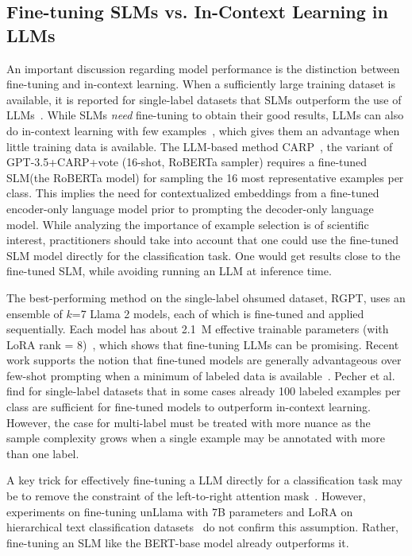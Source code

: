 \documentclass[lettersize,journal]{IEEEtran}
\newcommand{\SLM}{SLM\xspace}
\newcommand{\SLMs}{SLMs\xspace}
\newcommand{\LLM}{LLM\xspace}
\newcommand{\LLMs}{LLMs\xspace}
\begin{document}
\subsection{Fine-tuning \SLMs vs. In-Context Learning in \LLMs}

An important discussion regarding model performance is the distinction between fine-tuning and in-context learning. 
When a sufficiently large training dataset is available, it is reported for single-label datasets that \SLMs outperform the use of \LLMs~\cite{DBLP:conf/emnlp/PecherSB25-100-samples}.
While SLMs \emph{need} fine-tuning to obtain their good results, LLMs can also do in-context learning with few examples~\cite{DBLP:conf/emnlp/PecherSB25-100-samples}, which gives them an advantage when little training data is available.  
The \LLM-based method  CARP~\cite{carp}, \ie the variant of GPT-3.5+CARP+vote (16-shot, RoBERTa sampler) requires a fine-tuned \SLM (the RoBERTa model) for sampling the 16 most representative examples per class.
This implies the need for contextualized embeddings from a fine-tuned encoder-only language model prior to prompting the decoder-only language model. 
While analyzing the importance of example selection is of scientific interest, practitioners should take into account that one could use the fine-tuned SLM model directly for the classification task.
One would get results close to the fine-tuned SLM, while avoiding running an \LLM at inference time.

The best-performing method on the single-label ohsumed dataset, RGPT, uses an ensemble of $k$=7 Llama 2 models, each of which is fine-tuned and applied sequentially.  
Each model has about 2.1~M effective trainable parameters (with LoRA rank = 8)~\cite{pushing-the-limit-11346014-rgpt}, which shows that fine-tuning LLMs can be promising. 
Recent work supports the notion that fine-tuned models are generally advantageous over few-shot prompting when a minimum of labeled data is available~\cite{edwards2024language,bucher2024finetunedsmallllmsstill,lepagnol2024smalllanguagemodelsgood,yehudai2024fastfit}.
Pecher et al.~\cite{DBLP:conf/emnlp/PecherSB25-100-samples} find for single-label datasets that in some cases already 100 labeled examples per class are sufficient for fine-tuned models to outperform in-context learning. However, the case for multi-label must be treated with more nuance as the sample complexity grows when a single example may be annotated with more than one label.

A key trick for effectively fine-tuning a \LLM directly for a classification task may be to remove the constraint of the left-to-right attention mask~\cite{li2023label}.
However, experiments on fine-tuning unLlama with 7B parameters and LoRA on hierarchical text classification datasets~\cite{hydra} do not confirm this assumption.
Rather, fine-tuning an \SLM like the BERT-base model already outperforms it.
\end{document}
